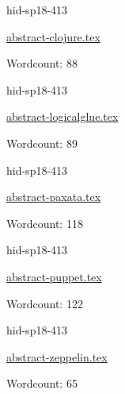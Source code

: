 

\begin{IU}

hid-sp18-413

\href{https://github.com/cloudmesh-community/hid-sp18-413/blob/master//technology/abstract-clojure.tex}{abstract-clojure.tex}

 

Wordcount: 88

\end{IU}



\begin{IU}

hid-sp18-413

\href{https://github.com/cloudmesh-community/hid-sp18-413/blob/master//technology/abstract-logicalglue.tex}{abstract-logicalglue.tex}

 

Wordcount: 89

\end{IU}



\begin{IU}

hid-sp18-413

\href{https://github.com/cloudmesh-community/hid-sp18-413/blob/master//technology/abstract-paxata.tex}{abstract-paxata.tex}

 

Wordcount: 118

\end{IU}



\begin{IU}

hid-sp18-413

\href{https://github.com/cloudmesh-community/hid-sp18-413/blob/master//technology/abstract-puppet.tex}{abstract-puppet.tex}

 

Wordcount: 122

\end{IU}



\begin{IU}

hid-sp18-413

\href{https://github.com/cloudmesh-community/hid-sp18-413/blob/master//technology/abstract-zeppelin.tex}{abstract-zeppelin.tex}

 

Wordcount: 65

\end{IU}

